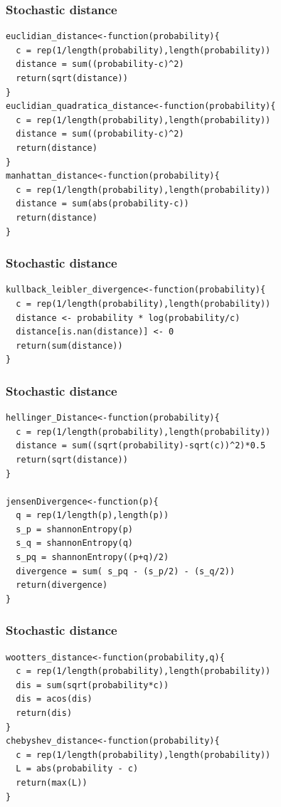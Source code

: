 \documentclass[10pt, compress]{beamer}
\begin{document}
\begin{frame}[fragile]
\frametitle{Stochastic distance}
 \begin{lstlisting}
euclidian_distance<-function(probability){
  c = rep(1/length(probability),length(probability))
  distance = sum((probability-c)^2)
  return(sqrt(distance))
}
euclidian_quadratica_distance<-function(probability){
  c = rep(1/length(probability),length(probability))
  distance = sum((probability-c)^2)
  return(distance)
}
manhattan_distance<-function(probability){
  c = rep(1/length(probability),length(probability))
  distance = sum(abs(probability-c))
  return(distance)
}
\end{lstlisting}
\end{frame}


\begin{frame}[fragile]
\frametitle{Stochastic distance}
 \begin{lstlisting}
kullback_leibler_divergence<-function(probability){
  c = rep(1/length(probability),length(probability))
  distance <- probability * log(probability/c)
  distance[is.nan(distance)] <- 0
  return(sum(distance))
}
\end{lstlisting}
\end{frame}

\begin{frame}[fragile]
\frametitle{Stochastic distance}
 \begin{lstlisting}
hellinger_Distance<-function(probability){
  c = rep(1/length(probability),length(probability))
  distance = sum((sqrt(probability)-sqrt(c))^2)*0.5
  return(sqrt(distance))
}

jensenDivergence<-function(p){
  q = rep(1/length(p),length(p))
  s_p = shannonEntropy(p)
  s_q = shannonEntropy(q)
  s_pq = shannonEntropy((p+q)/2)
  divergence = sum( s_pq - (s_p/2) - (s_q/2))
  return(divergence)
}
\end{lstlisting}
\end{frame}

\begin{frame}[fragile]
\frametitle{Stochastic distance}
 \begin{lstlisting}
wootters_distance<-function(probability,q){
  c = rep(1/length(probability),length(probability))
  dis = sum(sqrt(probability*c))
  dis = acos(dis)
  return(dis)
}
chebyshev_distance<-function(probability){
  c = rep(1/length(probability),length(probability))
  L = abs(probability - c)
  return(max(L))
}
\end{lstlisting}
\end{frame}
\end{document}

